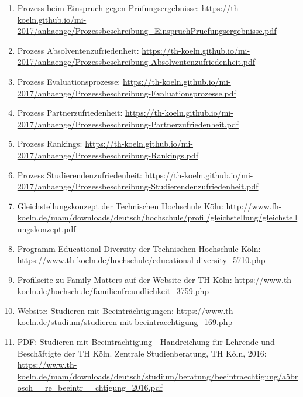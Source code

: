 \documentclass[BCOR12mm,DIV11,titlepage,a4paper,oneside,10pt]{scrbook}
\begin{document}
\begin{sloppypar}
\begin{flushleft}
\begin{enumerate}
\item{Prozess beim Einspruch gegen Prüfungsergebnisse: \url{https://th-koeln.github.io/mi-2017/anhaenge/Prozessbeschreibung\_EinspruchPruefungsergebnisse.pdf} } 
\item{Prozess Absolventenzufriedenheit: \url{https://th-koeln.github.io/mi-2017/anhaenge/Prozessbeschreibung-Absolventenzufriedenheit.pdf} } 
\item{Prozess Evaluationsprozesse: \url{https://th-koeln.github.io/mi-2017/anhaenge/Prozessbeschreibung-Evaluationsprozesse.pdf} } 
\item{Prozess Partnerzufriedenheit: \url{https://th-koeln.github.io/mi-2017/anhaenge/Prozessbeschreibung-Partnerzufriedenheit.pdf} } 
\item{Prozess Rankings: \url{https://th-koeln.github.io/mi-2017/anhaenge/Prozessbeschreibung-Rankings.pdf} } 
\item{Prozess Studierendenzufriedenheit: \url{https://th-koeln.github.io/mi-2017/anhaenge/Prozessbeschreibung-Studierendenzufriedenheit.pdf} } 
\item{Gleichstellungskonzept der Technischen Hochschule Köln: \url{http://www.fh-koeln.de/mam/downloads/deutsch/hochschule/profil/gleichstellung/gleichstellungskonzept.pdf} } 
\item{Programm Educational Diversity der Technischen Hochschule Köln: \url{https://www.th-koeln.de/hochschule/educational-diversity\_5710.php} } 
\item{Profilseite zu Family Matters auf der Website der TH Köln: \url{https://www.th-koeln.de/hochschule/familienfreundlichkeit\_3759.php} } 
\item{Website: Studieren mit Beeinträchtigungen: \url{https://www.th-koeln.de/studium/studieren-mit-beeintraechtigung\_169.php} } 
\item{PDF: Studieren mit Beeinträchtigung - Handreichung für Lehrende und Beschäftigte der TH Köln. Zentrale Studienberatung, TH Köln, 2016: \url{https://www.th-koeln.de/mam/downloads/deutsch/studium/beratung/beeintraechtigung/a5brosch\_\_re\_beeintr\_\_chtigung\_2016.pdf} } 

\end{enumerate}

\end{flushleft}
\end{sloppypar}

\backmatter
\end{document}
